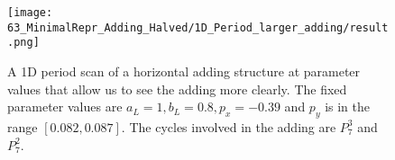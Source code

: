 \begin{figure}
    \centering
    \texttt{[image: 63\_MinimalRepr\_Adding\_Halved/1D\_Period\_larger\_adding/result.png]}
    \caption{
        A 1D period scan of a horizontal adding structure at parameter values that allow us to see the adding more clearly.
        The fixed parameter values are $a_L = 1, b_L = 0.8, p_x = -0.39$ and $p_y$ is in the range $[0.082, 0.087]$.
        The cycles involved in the adding are $P_7^3$ and $P_7^2$.
    }
    \label{fig:minrep.adding1.large.adding}
\end{figure}


%
%
%
%
